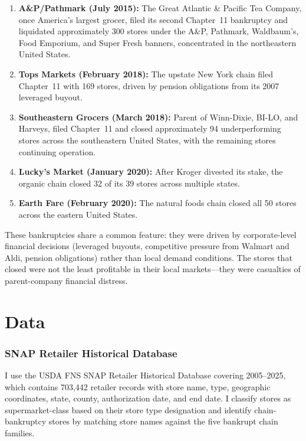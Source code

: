 \documentclass[12pt]{article}
\begin{document}
\begin{enumerate}
\item \textbf{A\&P/Pathmark (July 2015):} The Great Atlantic \& Pacific Tea Company, once America's largest grocer, filed its second Chapter~11 bankruptcy and liquidated approximately 300 stores under the A\&P, Pathmark, Waldbaum's, Food Emporium, and Super Fresh banners, concentrated in the northeastern United States.

\item \textbf{Tops Markets (February 2018):} The upstate New York chain filed Chapter~11 with 169 stores, driven by pension obligations from its 2007 leveraged buyout.

\item \textbf{Southeastern Grocers (March 2018):} Parent of Winn-Dixie, BI-LO, and Harveys, filed Chapter~11 and closed approximately 94 underperforming stores across the southeastern United States, with the remaining stores continuing operation.

\item \textbf{Lucky's Market (January 2020):} After Kroger divested its stake, the organic chain closed 32 of its 39 stores across multiple states.

\item \textbf{Earth Fare (February 2020):} The natural foods chain closed all 50 stores across the eastern United States.
\end{enumerate}

These bankruptcies share a common feature: they were driven by corporate-level financial decisions (leveraged buyouts, competitive pressure from Walmart and Aldi, pension obligations) rather than local demand conditions. The stores that closed were not the least profitable in their local markets---they were casualties of parent-company financial distress.

\section{Data}
\label{sec:data}

\subsubsection*{SNAP Retailer Historical Database} I use the USDA FNS SNAP Retailer Historical Database covering 2005--2025, which contains 703,442 retailer records with store name, type, geographic coordinates, state, county, authorization date, and end date. I classify stores as supermarket-class based on their store type designation and identify chain-bankruptcy stores by matching store names against the five bankrupt chain families.
\end{document}
